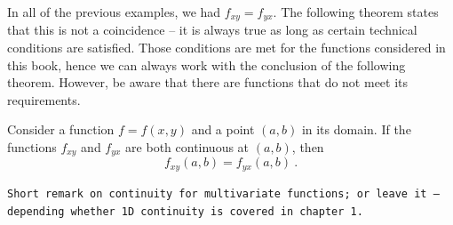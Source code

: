\begin{remark}
In all of the previous examples, we had $f_{xy}=f_{yx}$. The following theorem states that this is not a coincidence -- it is always true as long as certain technical conditions are satisfied. Those conditions are met for the functions considered in this book, hence we can always work with the conclusion of the following theorem. However, be aware that there are functions that do not meet its requirements.
\end{remark}

\begin{theorem}
\label{thm:schwarz}
Consider a function $f=f(x,y)$ and a point $(a,b)$ in its domain. If the functions $f_{xy}$ and
$f_{yx}$ are both continuous at $(a,b)$, then
\[f_{xy}(a,b)=f_{yx}(a,b) \:. \]
\end{theorem}

\begin{remark}
\texttt{Short remark on continuity for multivariate functions; or leave it -- depending whether 1D continuity is covered in chapter 1.}
\end{remark}

